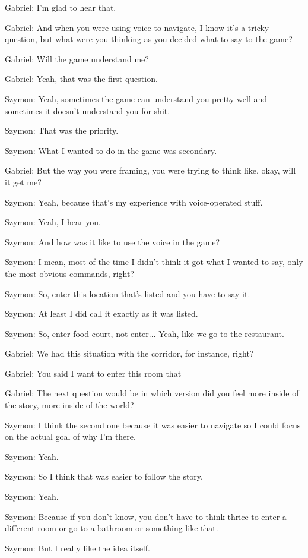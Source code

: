 Gabriel: I'm glad to hear that.

Gabriel: And when you were using voice to navigate, I know it's a tricky question, but what were you thinking as you decided what to say to the game?

Gabriel: Will the game understand me?

Gabriel: Yeah, that was the first question.

Szymon: Yeah, sometimes the game can understand you pretty well and sometimes it doesn't understand you for shit.

Szymon: That was the priority.

Szymon: What I wanted to do in the game was secondary.

Gabriel: But the way you were framing, you were trying to think like, okay, will it get me?

Szymon: Yeah, because that's my experience with voice-operated stuff.

Szymon: Yeah, I hear you.

Szymon: And how was it like to use the voice in the game?

Szymon: I mean, most of the time I didn't think it got what I wanted to say, only the most obvious commands, right?

Szymon: So, enter this location that's listed and you have to say it.

Szymon: At least I did call it exactly as it was listed.

Szymon: So, enter food court, not enter... Yeah, like we go to the restaurant.

Gabriel: We had this situation with the corridor, for instance, right?

Gabriel: You said I want to enter this room that

Gabriel: The next question would be in which version did you feel more inside of the story, more inside of the world?

Szymon: I think the second one because it was easier to navigate so I could focus on the actual goal of why I'm there.

Szymon: Yeah.

Szymon: So I think that was easier to follow the story.

Szymon: Yeah.

Szymon: Because if you don't know, you don't have to think thrice to enter a different room or go to a bathroom or something like that.

Szymon: But I really like the idea itself.

